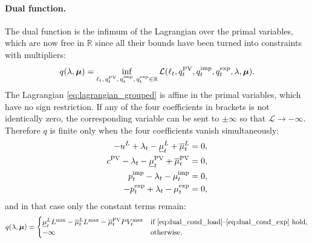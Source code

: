 \paragraph{Dual function.}
The dual function is the infimum of the Lagrangian over the primal variables, which are now
free in $\mathbb{R}$ since all their bounds have been turned into constraints with multipliers:
\begin{equation}
    q(\lambda, \boldsymbol{\mu}) = \inf_{\ell_{t},\, q^{\mathrm{PV}}_{t},\, q^{\mathrm{imp}}_{t},\, q^{\mathrm{exp}}_{t} \in \mathbb{R}}
    \mathcal{L}(\ell_{t}, q^{\mathrm{PV}}_{t}, q^{\mathrm{imp}}_{t}, q^{\mathrm{exp}}_{t}, \lambda, \boldsymbol{\mu}).
\end{equation}
The Lagrangian \eqref{eq:lagrangian_grouped} is affine in the primal variables, which have
no sign restriction. If any of the four coefficients in brackets is not identically zero, the
corresponding variable can be sent to $\pm\infty$ so that $\mathcal{L} \to -\infty$.
Therefore $q$ is finite only when the four coefficients vanish simultaneously:
\begin{align}
    -u^{L} + \lambda_{t} - \underline{\mu}^{L}_{t} + \overline{\mu}^{L}_{t} &= 0, \label{eq:dual_cond_load} \\
    c^{\mathrm{PV}} - \lambda_{t} - \underline{\mu}^{\mathrm{PV}}_{t} + \overline{\mu}^{\mathrm{PV}}_{t} &= 0, \label{eq:dual_cond_pv} \\
    p^{\mathrm{imp}}_{t} - \lambda_{t} - \mu^{\mathrm{imp}}_{t} &= 0, \label{eq:dual_cond_imp} \\
    -p^{\mathrm{exp}}_{t} + \lambda_{t} - \mu^{\mathrm{exp}}_{t} &= 0, \label{eq:dual_cond_exp}
\end{align}
and in that case only the constant terms remain:
\begin{equation}
    q(\lambda, \boldsymbol{\mu}) =
    \begin{cases}
        \underline{\mu}^{L}_{t} L^{\min} - \overline{\mu}^{L}_{t} L^{\max} - \overline{\mu}^{\mathrm{PV}}_{t} PV_{t}^{\max}
        & \text{if \eqref{eq:dual_cond_load}--\eqref{eq:dual_cond_exp} hold,} \\
        -\infty & \text{otherwise.}
    \end{cases}
\end{equation}

